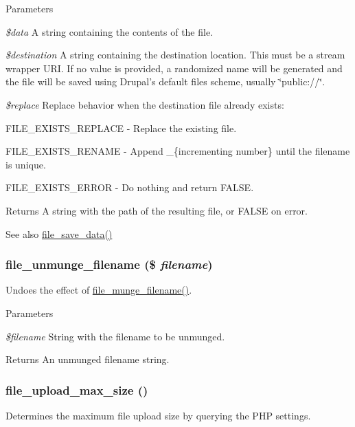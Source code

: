 \begin{DoxyParams}{Parameters}
\item[{\em \$data}]A string containing the contents of the file. \item[{\em \$destination}]A string containing the destination location. This must be a stream wrapper URI. If no value is provided, a randomized name will be generated and the file will be saved using Drupal's default files scheme, usually \char`\"{}public://\char`\"{}. \item[{\em \$replace}]Replace behavior when the destination file already exists:
\begin{DoxyItemize}
\item FILE\_\-EXISTS\_\-REPLACE -\/ Replace the existing file.
\item FILE\_\-EXISTS\_\-RENAME -\/ Append \_\-\{incrementing number\} until the filename is unique.
\item FILE\_\-EXISTS\_\-ERROR -\/ Do nothing and return FALSE.
\end{DoxyItemize}\end{DoxyParams}
\begin{DoxyReturn}{Returns}
A string with the path of the resulting file, or FALSE on error.
\end{DoxyReturn}
\begin{DoxySeeAlso}{See also}
\hyperlink{group__file_ga7a01611c7c08b91876d93431207dd9b0}{file\_\-save\_\-data()} 
\end{DoxySeeAlso}
\hypertarget{group__file_gabda71018b91068bcd9fcd527a0493347}{
\subsubsection[{file\_\-unmunge\_\-filename}]{\setlength{\rightskip}{0pt plus 5cm}file\_\-unmunge\_\-filename (\$ {\em filename})}}
\label{group__file_gabda71018b91068bcd9fcd527a0493347}
Undoes the effect of \hyperlink{group__file_gae5f97959982c78dfde2f806757c21368}{file\_\-munge\_\-filename()}.


\begin{DoxyParams}{Parameters}
\item[{\em \$filename}]String with the filename to be unmunged.\end{DoxyParams}
\begin{DoxyReturn}{Returns}
An unmunged filename string. 
\end{DoxyReturn}
\hypertarget{group__file_ga7cf25e6a2532a1d022ee1c655f895380}{
\subsubsection[{file\_\-upload\_\-max\_\-size}]{\setlength{\rightskip}{0pt plus 5cm}file\_\-upload\_\-max\_\-size ()}}
\label{group__file_ga7cf25e6a2532a1d022ee1c655f895380}
Determines the maximum file upload size by querying the PHP settings.

